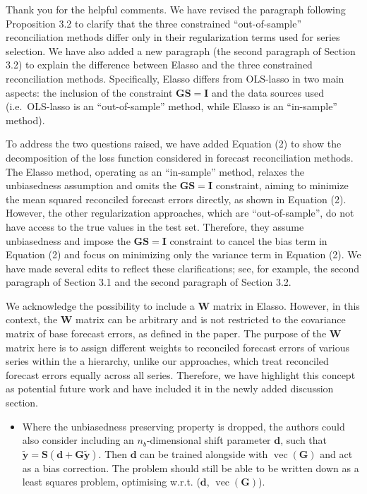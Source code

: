 \documentclass[11pt,a4paper,]{article}
\providecommand{\tightlist}{%
  \setlength{\itemsep}{0pt}\setlength{\parskip}{0pt}}
\renewenvironment{quote}
               {\list{}{\rightmargin\leftmargin}%
                \item\relax\color[RGB]{0,150,0}}
               {\endlist}
\begin{document}
\begin{quote}
Thank you for the helpful comments. We have revised the paragraph
following Proposition 3.2 to clarify that the three constrained
``out-of-sample'' reconciliation methods differ only in their
regularization terms used for series selection. We have also added a new
paragraph (the second paragraph of Section 3.2) to explain the
difference between Elasso and the three constrained reconciliation
methods. Specifically, Elasso differs from OLS-lasso in two main
aspects: the inclusion of the constraint \(\bm{GS}=\bm{I}\) and the data
sources used (i.e.~OLS-lasso is an ``out-of-sample'' method, while
Elasso is an ``in-sample'' method).

To address the two questions raised, we have added Equation (2) to show
the decomposition of the loss function considered in forecast
reconciliation methods. The Elasso method, operating as an ``in-sample''
method, relaxes the unbiasedness assumption and omits the
\(\bm{GS}=\bm{I}\) constraint, aiming to minimize the mean squared
reconciled forecast errors directly, as shown in Equation (2). However,
the other regularization approaches, which are ``out-of-sample'', do not
have access to the true values in the test set. Therefore, they assume
unbiasedness and impose the \(\bm{GS}=\bm{I}\) constraint to cancel the
bias term in Equation (2) and focus on minimizing only the variance term
in Equation (2). We have made several edits to reflect these
clarifications; see, for example, the second paragraph of Section 3.1
and the second paragraph of Section 3.2.

We acknowledge the possibility to include a \(\bm{W}\) matrix in Elasso.
However, in this context, the \(\bm{W}\) matrix can be arbitrary and is
not restricted to the covariance matrix of base forecast errors, as
defined in the paper. The purpose of the \(\bm{W}\) matrix here is to
assign different weights to reconciled forecast errors of various series
within the a hierarchy, unlike our approaches, which treat reconciled
forecast errors equally across all series. Therefore, we have highlight
this concept as potential future work and have included it in the newly
added discussion section.
\end{quote}

\begin{itemize}
\tightlist
\item
  Where the unbiasedness preserving property is dropped, the authors
  could also consider including an \(n_b\)-dimensional shift parameter
  \(\bm{d}\), such that
  \(\tilde{\bm{y}}=\bm{S}(\bm{d}+\bm{G}\tilde{\bm{y}})\). Then
  \(\bm{d}\) can be trained alongside with
  \(\operatorname{vec}(\bm{G})\) and act as a bias correction. The
  problem should still be able to be written down as a least squares
  problem, optimising w.r.t. (\(\bm{d}\),
  \(\operatorname{vec}(\bm{G})\)).
\end{itemize}
\end{document}
